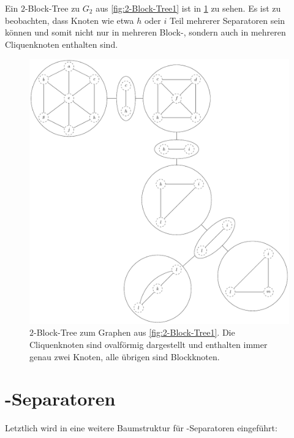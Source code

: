 Ein $2$-Block-Tree zu $G_2$ aus \Abb \ref{fig:2-Block-Tree1} ist in \Abb \ref{fig:2-Block-Tree2} zu sehen.
Es ist zu beobachten, dass Knoten wie etwa $h$ oder $i$ Teil mehrerer Separatoren sein können und somit nicht nur in mehreren Block-, sondern auch in mehreren Cliquenknoten enthalten sind.
\begin{figure}[H]
  \centering
  \includegraphics[width=\textwidth,height=\textheight,keepaspectratio]{bilder/2-Block-Tree2.pdf}
  \caption{$2$-Block-Tree zum Graphen aus \Abb \ref{fig:2-Block-Tree1}.
           Die Cliquenknoten sind ovalförmig dargestellt und enthalten immer genau zwei Knoten, alle übrigen sind Blockknoten.}
  \label{fig:2-Block-Tree2}
\end{figure}


\section{\dd-Separatoren}

Letztlich wird in \cite{ReL08} eine weitere Baumstruktur für \dd-Separatoren eingeführt:

